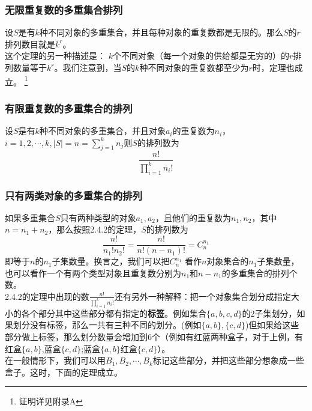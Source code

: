\documentclass{ctexart}
\begin{document}
   \subsubsection{无限重复数的多重集合排列}
   设$S$是有$k$种不同对象的多重集合，并且每种对象的重复数都是无限的。那么$S$的$r$排列数目就是$k^r$。\\
   这个定理的另一种描述是： $k$个不同对象（每一个对象的供给都是无穷的）的$r$排列数量等于$k^r$。我们注意到，当$S$的$k$种不同对象的重复数都至少为$r$时，定理也成立。
\footnote{证明详见附录A}
   \subsubsection{有限重复数的多重集合的排列}
   设$S$是有$k$种不同对象的多重集合，并且对象$a_i$的重复数为$n_i$，$i = 1,2,\cdots,k,|S| = n = \sum_{j=1}^k n_j$则$S$的排列数为
   \[\frac{n!}{\prod_{i=1}^k n_i!}\]
   \subsubsection{只有两类对象的多重集合的排列}
   如果多重集合$S$只有两种类型的对象$a_1,a_2$，且他们的重复数为$n_1,n_2$，其中$n = n_1 + n_2$，那么按照2.4.2的定理，$S$的排列数为
   \[\frac{n!}{n_1!n_2!} = \frac{n!}{n!(n-n_1)!} = C_n^{n_1}\]
即等于$n$的$n_1$子集数量。换言之，我们可以把$C_n^{n_1}$   看作$n$对象集合的$n_1$子集数量，也可以看作一个有两个类型对象且重复数分别为$n_1$和$n-n_1$的多重集合的排列个数。\\
2.4.2的定理中出现的数$\frac{n!}{\prod_{i=1}^k n_i!}$还有另外一种解释：把一个对象集合划分成指定大小的各个部分其中这些部分都有指定的\textbf{标签}。例如集合$\{a,b,c,d\}$的$2$子集划分，如果划分没有标签，那么一共有三种不同的划分。(例如$\{a,b\},\{c,d\}$)但如果给这些部分做上标签，那么划分数量会增加到$6$个（例如有红蓝两种盒子，对于上例，有红盒$\{a,b\}$,蓝盒$\{c,d\}$;蓝盒$\{a,b\}$红盒$\{c,d\}$）。\\
在一般情形下，我们可以用$B_1,B_2,\cdots,B_k$标记这些部分，并把这些部分想象成一些盒子。这时，下面的定理成立。
\end{document}
